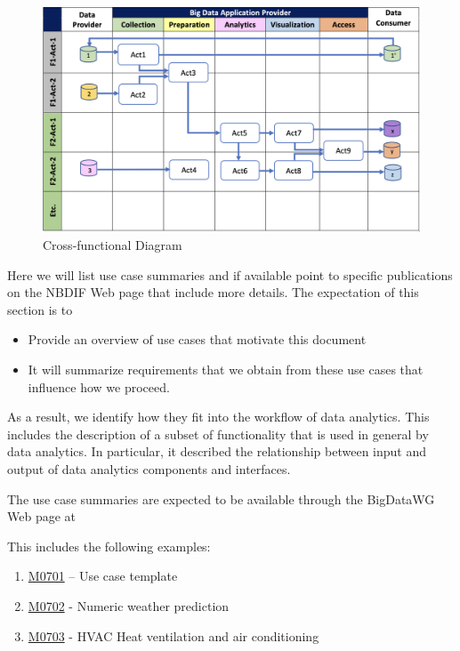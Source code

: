\documentclass[12pt]{article}
\begin{document}
\begin{figure}[htb]
    \centering
    \includegraphics[width=1.0\textwidth]{images/cross-functional-diagram.png}
    \caption{Cross-functional Diagram}
    \label{fig:cross-functional-diagram}
\end{figure}


Here we will list use case summaries and if available point to specific publications on the NBDIF Web page that include more details. The expectation of this section is to
 
\begin{itemize}
\item	Provide an overview of use cases that motivate this document
\item	It will summarize requirements that we obtain from these use cases that influence how we proceed.
\end{itemize}

As a result, we identify how they fit into the workflow of data analytics. This includes the description of a subset of functionality that is used in general by data analytics.  In particular, it described the relationship between input and output of data analytics components and interfaces. 

The use case summaries are expected to be available through the BigDataWG Web page at 


This includes the following examples:

\begin{enumerate}
\item	\href{https://bigdatawg.nist.gov/_uploadfiles/M0701_v1_2020102001.docx}{M0701} – Use case template
\item	\href{https://bigdatawg.nist.gov/_uploadfiles/M0702_v1_2020102002.pdf}{M0702} - Numeric weather prediction
\item	\href{https://bigdatawg.nist.gov/_uploadfiles/M0703_v1_2020102003.pdf}{M0703} - HVAC Heat ventilation and air conditioning 
\end{enumerate}
\end{document}
